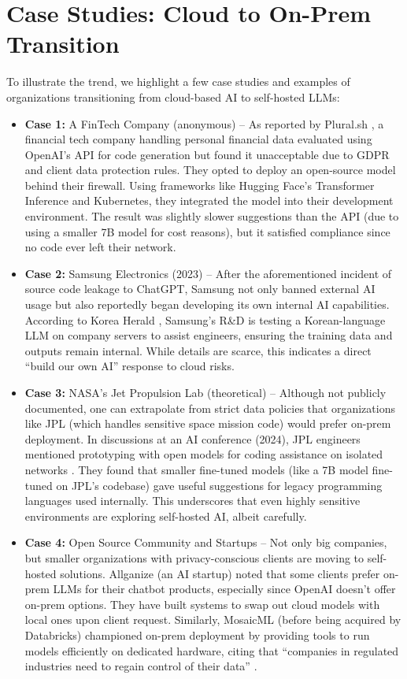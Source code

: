 \section{Case Studies: Cloud to On-Prem Transition}
\label{sec:case-studies}
To illustrate the trend, we highlight a few case studies and examples of organizations transitioning from cloud-based AI to self-hosted LLMs:
\begin{itemize}
    \item \textbf{Case 1:} A FinTech Company (anonymous) – As reported by Plural.sh \autocite{Plural2023}, a financial tech company handling personal financial data evaluated using OpenAI’s API for code generation but found it unacceptable due to GDPR and client data protection rules. They opted to deploy an open-source model behind their firewall. Using frameworks like Hugging Face’s Transformer Inference and Kubernetes, they integrated the model into their development environment. The result was slightly slower suggestions than the API (due to using a smaller 7B model for cost reasons), but it satisfied compliance since no code ever left their network.
    \item \textbf{Case 2:} Samsung Electronics (2023) – After the aforementioned incident of source code leakage to ChatGPT, Samsung not only banned external AI usage​ but also reportedly began developing its own internal AI capabilities. According to Korea Herald \autocite{KoreaHerald2023}, Samsung’s R\&D is testing a Korean-language LLM on company servers to assist engineers, ensuring the training data and outputs remain internal. While details are scarce, this indicates a direct “build our own AI” response to cloud risks.
    \item \textbf{Case 3:} NASA’s Jet Propulsion Lab (theoretical) – Although not publicly documented, one can extrapolate from strict data policies that organizations like JPL (which handles sensitive space mission code) would prefer on-prem deployment. In discussions at an AI conference (2024), JPL engineers mentioned prototyping with open models for coding assistance on isolated networks \autocite{JPL2024}. They found that smaller fine-tuned models (like a 7B model fine-tuned on JPL’s codebase) gave useful suggestions for legacy programming languages used internally. This underscores that even highly sensitive environments are exploring self-hosted AI, albeit carefully.
    \item \textbf{Case 4:} Open Source Community and Startups – Not only big companies, but smaller organizations with privacy-conscious clients are moving to self-hosted solutions. Allganize (an AI startup) noted that some clients prefer on-prem LLMs for their chatbot products, especially since OpenAI doesn’t offer on-prem options​. They have built systems to swap out cloud models with local ones upon client request. Similarly, MosaicML (before being acquired by Databricks) championed on-prem deployment by providing tools to run models efficiently on dedicated hardware, citing that “companies in regulated industries need to regain control of their data” \autocite{MosaicML2023}.
\end{itemize}

